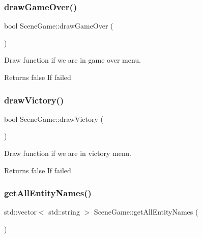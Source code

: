 \subsubsection{\texorpdfstring{draw\+Game\+Over()}{drawGameOver()}}
{\footnotesize\ttfamily bool Scene\+Game\+::draw\+Game\+Over (\begin{DoxyParamCaption}{ }\end{DoxyParamCaption})}



Draw function if we are in game over menu. 

\begin{DoxyReturn}{Returns}
false If failed 
\end{DoxyReturn}
\mbox{\label{class_scene_game_a4465a247855d6ce62717bad15f9058c8}} 
\subsubsection{\texorpdfstring{draw\+Victory()}{drawVictory()}}
{\footnotesize\ttfamily bool Scene\+Game\+::draw\+Victory (\begin{DoxyParamCaption}{ }\end{DoxyParamCaption})}



Draw function if we are in victory menu. 

\begin{DoxyReturn}{Returns}
false If failed 
\end{DoxyReturn}
\mbox{\label{class_scene_game_a0b61f99b30b1c18723eb9e34add60364}} 
\subsubsection{\texorpdfstring{get\+All\+Entity\+Names()}{getAllEntityNames()}}
{\footnotesize\ttfamily std\+::vector$<$ std\+::string $>$ Scene\+Game\+::get\+All\+Entity\+Names (\begin{DoxyParamCaption}{ }\end{DoxyParamCaption})\hspace{0.3cm}{\ttfamily [static]}}




